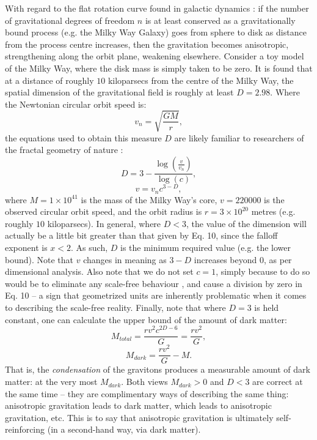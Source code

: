 \documentclass[12pt]{article}
\begin{document}
With regard to the flat rotation curve found in galactic dynamics \cite{binney}: if the number of gravitational degrees of freedom $n$ is at least conserved as a gravitationally bound process (e.g. the Milky Way Galaxy) goes from sphere to disk as distance from the process centre increases, then the gravitation becomes anisotropic, strengthening along the orbit plane, weakening elsewhere.
Consider a toy model of the Milky Way, where the disk mass is simply taken to be zero. 
It is found that at a distance of roughly $10$ kiloparsecs from the centre of the Milky Way, the spatial dimension of the gravitational field is roughly at least $D = 2.98$.
Where the Newtonian circular orbit speed is:
\begin{equation}
v_n = \sqrt{\frac{GM}{r}},
\end{equation}
the equations used to obtain this measure $D$ are likely familiar to researchers of the fractal geometry of nature \cite{mandelbrot}:
\begin{equation}
D = 3 - \frac{\log \left(\frac{v}{v_n} \right)}{\log(c)},
\end{equation}
\begin{equation}
v = v_n c^{3 - D},
\end{equation}
where $M = 1 \times 10^{41}$ is the mass of the Milky Way's core, $v = 220000$ is the observed circular orbit speed, and the orbit radius is $r = 3 \times 10^{20}$ metres (e.g. roughly $10$ kiloparsecs).
In general, where $D < 3$, the value of the dimension will actually be a little bit greater than that given by Eq. 10, since the falloff exponent is $x < 2$.
As such, $D$ is the minimum required value (e.g. the lower bound).
Note that $v$ changes in meaning as ${3 - D}$ increases beyond $0$, as per dimensional analysis.
Also note that we do not set $c = 1$, simply because to do so would be to eliminate any scale-free behaviour \cite{mm}, and cause a division by zero in Eq. 10 -- a sign that geometrized units are inherently problematic when it comes to describing the scale-free reality.
Finally, note that where $D = 3$ is held constant, one can calculate the upper bound of the amount of dark matter:
\begin{equation}
M_{total} = \frac{r v^2 c^{2D - 6}}{G} = \frac{r v^2}{G},
\end{equation}
\begin{equation}
M_{dark} = \frac{r v^2}{G} - M.
\end{equation}
That is, the {\textit{condensation}} of the gravitons produces a measurable amount of dark matter: at the very most $M_{dark}$.
Both views $M_{dark} > 0$ and $D < 3$ are correct at the same time -- they are complimentary ways of describing the same thing: anisotropic gravitation leads to dark matter, which leads to anisotropic gravitation, etc.
This is to say that anisotropic gravitation is ultimately self-reinforcing (in a second-hand way, via dark matter).
\end{document}
